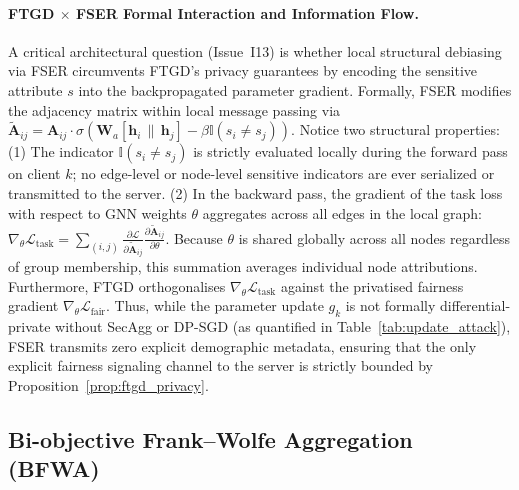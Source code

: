 \documentclass[pdflatex,sn-mathphys-num]{sn-jnl}
\theoremstyle{thmstyleone}%
\theoremstyle{thmstyletwo}%
\theoremstyle{thmstylethree}%
\begin{document}
\paragraph{FTGD $\times$ FSER Formal Interaction and Information Flow.}
A critical architectural question (Issue~I13) is whether local structural debiasing via FSER circumvents FTGD's privacy guarantees by encoding the sensitive attribute $s$ into the backpropagated parameter gradient. Formally, FSER modifies the adjacency matrix within local message passing via $\tilde{\mathbf{A}}_{ij} = \mathbf{A}_{ij} \cdot \sigma(\mathbf{W}_a [\mathbf{h}_i \,\|\, \mathbf{h}_j] - \beta \mathbb{I}(s_i \neq s_j))$. Notice two structural properties:
(1) The indicator $\mathbb{I}(s_i \neq s_j)$ is strictly evaluated locally during the forward pass on client $k$; no edge-level or node-level sensitive indicators are ever serialized or transmitted to the server.
(2) In the backward pass, the gradient of the task loss with respect to GNN weights $\theta$ aggregates across all edges in the local graph: $\nabla_\theta \mathcal{L}_{\text{task}} = \sum_{(i,j)} \frac{\partial \mathcal{L}}{\partial \tilde{\mathbf{A}}_{ij}} \frac{\partial \tilde{\mathbf{A}}_{ij}}{\partial \theta}$. Because $\theta$ is shared globally across all nodes regardless of group membership, this summation averages individual node attributions. Furthermore, FTGD orthogonalises $\nabla_\theta \mathcal{L}_{\text{task}}$ against the privatised fairness gradient $\nabla_\theta \mathcal{L}_{\text{fair}}$. 
Thus, while the parameter update $g_k$ is not formally differential-private without SecAgg or DP-SGD (as quantified in Table~\ref{tab:update_attack}), FSER transmits zero explicit demographic metadata, ensuring that the only explicit fairness signaling channel to the server is strictly bounded by Proposition~\ref{prop:ftgd_privacy}.

\subsection{Bi-objective Frank--Wolfe Aggregation (BFWA)}
\label{sec:bfwa}
\end{document}
